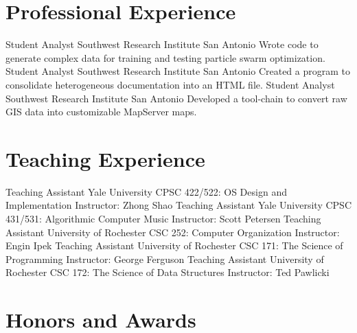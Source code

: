 \documentclass[10pt,letterpaper,sans]{moderncv}
\begin{document}
\section{Professional Experience}

        {Student Analyst}
        {Southwest Research Institute}
        {San Antonio}
        {}
        {Wrote code to generate complex data for training and testing particle
         swarm optimization.}
        {Student Analyst}
        {Southwest Research Institute}
        {San Antonio}
        {}
        {Created a program to consolidate heterogeneous documentation into an
         HTML file.}
        {Student Analyst}
        {Southwest Research Institute}
        {San Antonio}
        {}
        {Developed a tool-chain to convert raw GIS data into customizable
         MapServer maps.}

\section{Teaching Experience}

        {Teaching Assistant}
        {Yale University}
        {CPSC 422/522: OS Design and Implementation}
        {}
        {Instructor: Zhong Shao}
        {Teaching Assistant}
        {Yale University}
        {CPSC 431/531: Algorithmic Computer Music}
        {}
        {Instructor: Scott Petersen}
        {Teaching Assistant}
        {University of Rochester}
        {CSC 252: Computer Organization}
        {}
        {Instructor: Engin Ipek}
        {Teaching Assistant}
        {University of Rochester}
        {CSC 171: The Science of Programming}
        {}
        {Instructor: George Ferguson}
        {Teaching Assistant}
        {University of Rochester}
        {CSC 172: The Science of Data Structures}
        {}
        {Instructor: Ted Pawlicki}

\section{Honors and Awards}


\nocite{*}


\end{document}
